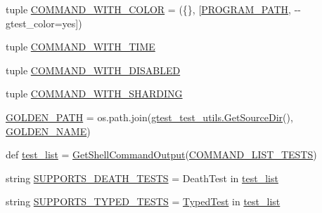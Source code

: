 \begin{DoxyCompactItemize}
\item 
tuple \mbox{\hyperlink{namespacegoogletest-output-test_ab4c3db724c6b581470a94b3118560a02}{C\+O\+M\+M\+A\+N\+D\+\_\+\+W\+I\+T\+H\+\_\+\+C\+O\+L\+OR}} = (\{\}, \mbox{[}\mbox{\hyperlink{namespacegoogletest-output-test_a36302384d49a636defe86704a422acb2}{P\+R\+O\+G\+R\+A\+M\+\_\+\+P\+A\+TH}}, \textquotesingle{}-\/-\/gtest\+\_\+color=yes\textquotesingle{}\mbox{]})
\item 
tuple \mbox{\hyperlink{namespacegoogletest-output-test_a748a138d54fa2c04f5ac4205ecc0e4e9}{C\+O\+M\+M\+A\+N\+D\+\_\+\+W\+I\+T\+H\+\_\+\+T\+I\+ME}}
\item 
tuple \mbox{\hyperlink{namespacegoogletest-output-test_a23aca1c76efbf8895d71a441c77a0225}{C\+O\+M\+M\+A\+N\+D\+\_\+\+W\+I\+T\+H\+\_\+\+D\+I\+S\+A\+B\+L\+ED}}
\item 
tuple \mbox{\hyperlink{namespacegoogletest-output-test_a7956407a07f884d3960e956ccb2571a6}{C\+O\+M\+M\+A\+N\+D\+\_\+\+W\+I\+T\+H\+\_\+\+S\+H\+A\+R\+D\+I\+NG}}
\item 
\mbox{\hyperlink{namespacegoogletest-output-test_aaf2c3cbfc15d83d986e1e2ba99a94a3e}{G\+O\+L\+D\+E\+N\+\_\+\+P\+A\+TH}} = os.\+path.\+join(\mbox{\hyperlink{namespacegtest__test__utils_aaff66cb0980804d8bd57dc719d4b5518}{gtest\+\_\+test\+\_\+utils.\+Get\+Source\+Dir}}(), \mbox{\hyperlink{namespacegoogletest-output-test_a66b45fb215424c968b479fbf864f1e7f}{G\+O\+L\+D\+E\+N\+\_\+\+N\+A\+ME}})
\item 
def \mbox{\hyperlink{namespacegoogletest-output-test_aa116be76cb5d1da2469f2811706bf08e}{test\+\_\+list}} = \mbox{\hyperlink{namespacegoogletest-output-test_aba640d7d1d0c51624f079baff79a04ab}{Get\+Shell\+Command\+Output}}(\mbox{\hyperlink{namespacegoogletest-output-test_accb05a0a5c9b083723186bb6116f928f}{C\+O\+M\+M\+A\+N\+D\+\_\+\+L\+I\+S\+T\+\_\+\+T\+E\+S\+TS}})
\item 
string \mbox{\hyperlink{namespacegoogletest-output-test_a3df1558c443e0307fa5a68ec1a698850}{S\+U\+P\+P\+O\+R\+T\+S\+\_\+\+D\+E\+A\+T\+H\+\_\+\+T\+E\+S\+TS}} = \textquotesingle{}Death\+Test\textquotesingle{} in \mbox{\hyperlink{namespacegoogletest-output-test_aa116be76cb5d1da2469f2811706bf08e}{test\+\_\+list}}
\item 
string \mbox{\hyperlink{namespacegoogletest-output-test_a20362e86a65972b4ca1d030daabb0485}{S\+U\+P\+P\+O\+R\+T\+S\+\_\+\+T\+Y\+P\+E\+D\+\_\+\+T\+E\+S\+TS}} = \textquotesingle{}\mbox{\hyperlink{class_typed_test}{Typed\+Test}}\textquotesingle{} in \mbox{\hyperlink{namespacegoogletest-output-test_aa116be76cb5d1da2469f2811706bf08e}{test\+\_\+list}}

\end{DoxyCompactItemize}
